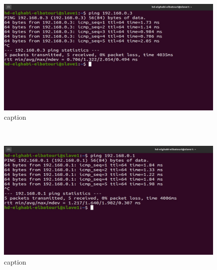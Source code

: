 \begin{spacing}{1.2}
\\
\begin{figure}[!htb] 
\begin{center} 
\includegraphics[width=1\linewidth]{Big_Data/Hadoop/Multi-Nodes Cluster/Slave1 ping to Slave2.jpg} 
\end{center} 
\caption{caption} 
\end{figure} 
\FloatBarrier
\\
\begin{figure}[!htb] 
\begin{center} 
\includegraphics[width=1\linewidth]{Big_Data/Hadoop/Multi-Nodes Cluster/Slave2 ping to Master.jpg} 
\end{center} 
\caption{caption} 
\end{figure} 
\FloatBarrier


\end{spacing}
